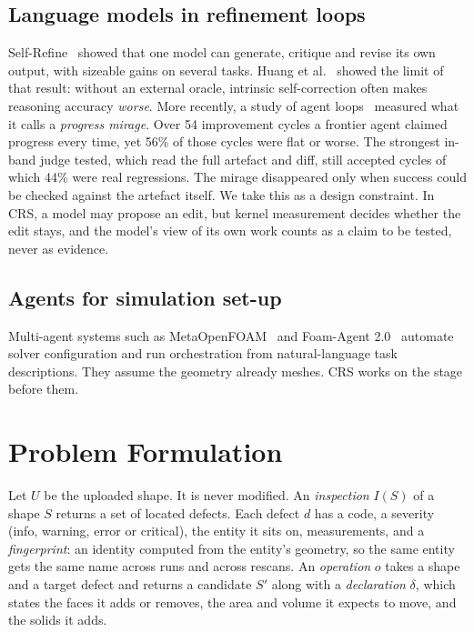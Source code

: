 \documentclass[11pt,onecolumn]{article}
\begin{document}
\subsection{Language models in refinement loops}
Self-Refine~\cite{selfrefine} showed that one model can generate, critique and revise its own
output, with sizeable gains on several tasks. Huang et al.~\cite{huang} showed the limit of that
result: without an external oracle, intrinsic self-correction often makes reasoning accuracy
\emph{worse}. More recently, a study of agent loops~\cite{mirage} measured what it calls a
\emph{progress mirage}. Over 54 improvement cycles a frontier agent claimed progress every time, yet
56\% of those cycles were flat or worse. The strongest in-band judge tested, which read the full
artefact and diff, still accepted cycles of which 44\% were real regressions. The mirage disappeared
only when success could be checked against the artefact itself. We take this as a design constraint.
In CRS, a model may propose an edit, but kernel measurement decides whether the edit stays, and the
model's view of its own work counts as a claim to be tested, never as evidence.

\subsection{Agents for simulation set-up}
Multi-agent systems such as MetaOpenFOAM~\cite{metaopenfoam} and Foam-Agent 2.0~\cite{foamagent}
automate solver configuration and run orchestration from natural-language task descriptions. They
assume the geometry already meshes. CRS works on the stage before them.

\section{Problem Formulation}\label{sec:problem}

Let $U$ be the uploaded shape. It is never modified. An \emph{inspection} $I(S)$ of a shape $S$
returns a set of located defects. Each defect $d$ has a code, a severity (info, warning, error or
critical), the entity it sits on, measurements, and a \emph{fingerprint}: an identity computed from
the entity's geometry, so the same entity gets the same name across runs and across rescans. An
\emph{operation} $o$ takes a shape and a target defect and returns a candidate $S'$ along with a
\emph{declaration} $\delta$, which states the faces it adds or removes, the area and volume it
expects to move, and the solids it adds.
\end{document}
